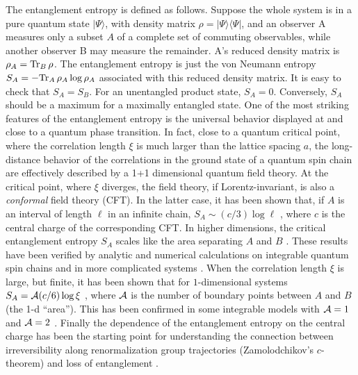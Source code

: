 The entanglement entropy is defined as follows.  
Suppose the whole system is in a pure quantum state $|\Psi\rangle$, 
with density matrix
$\rho=|\Psi\rangle\langle\Psi|$, and an observer A measures only a
subset $A$ of a complete set of commuting observables, while another
observer B may measure the remainder. A's reduced density matrix is
$\rho_A={\rm Tr}_B\,\rho$. The entanglement entropy is just the von
Neumann entropy $S_A=-{\rm Tr}_A\,\rho_A\log\rho_A$ associated with this
reduced density matrix. It is easy to check that $S_A=S_B$. For an
unentangled product state, $S_A=0$. Conversely, $S_A$ should be a
maximum for a maximally entangled state. 
One of the most striking features of the entanglement entropy is the 
universal behavior displayed at and close to a quantum phase transition.
In fact, close to a quantum critical point, where the correlation length 
$\xi$ is much larger than the lattice spacing $a$, 
the long-distance behavior of the correlations in the ground state of
a quantum spin chain are effectively described by a 1+1 dimensional 
quantum field theory.
At the critical point, where $\xi$ diverges, the field theory, if
Lorentz-invariant, is also  
a {\em conformal} field theory (CFT). 
In the latter case, it has been shown that, if $A$ is an interval of 
length $\ell$ in an infinite chain,  
$S_A\sim (c/3)\log\ell$ \cite{Holzhey,cc-04}, where $c$ is 
the central charge of the corresponding CFT.
In higher dimensions, the critical entanglement entropy $S_A$ scales like
the area separating $A$ and $B$ \cite{s-93,Vidal,cc-04}.
These results have been verified by analytic and numerical calculations on 
integrable quantum spin chains and in more complicated 
systems \cite{Vidal,jk-04,ijk-04,p-05,other,dur}. 
When the correlation length $\xi$ is large, but finite, it has been shown that
for $1$-dimensional systems $S_A= {\cal A}(c/6)\log\xi$ \cite{cc-04}, 
where ${\cal A}$ is the number of boundary points between $A$ and $B$
(the 1-d ``area''). This has been confirmed in some integrable models 
with ${\cal A}=1$ \cite{cc-04} and ${\cal A}=2$ \cite{ijk-04,p-05}.
Finally the dependence of the entanglement entropy on the central charge
has been the starting point for understanding the 
connection between irreversibility 
along renormalization group trajectories (Zamolodchikov's 
$c$-theorem\cite{Zam}) and loss of entanglement \cite{Vidal,loss}.

